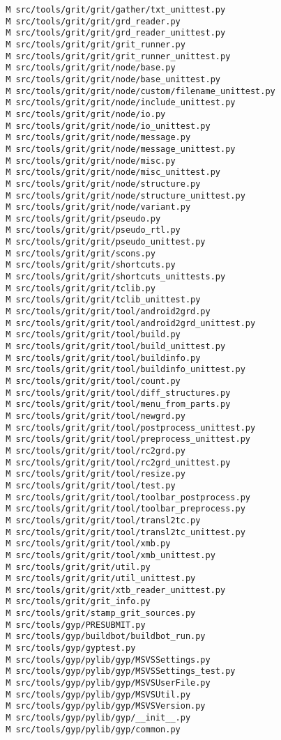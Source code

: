 \documentclass{article}
\begin{document}
\begin{verbatim}
 M src/tools/grit/grit/gather/txt_unittest.py
 M src/tools/grit/grit/grd_reader.py
 M src/tools/grit/grit/grd_reader_unittest.py
 M src/tools/grit/grit/grit_runner.py
 M src/tools/grit/grit/grit_runner_unittest.py
 M src/tools/grit/grit/node/base.py
 M src/tools/grit/grit/node/base_unittest.py
 M src/tools/grit/grit/node/custom/filename_unittest.py
 M src/tools/grit/grit/node/include_unittest.py
 M src/tools/grit/grit/node/io.py
 M src/tools/grit/grit/node/io_unittest.py
 M src/tools/grit/grit/node/message.py
 M src/tools/grit/grit/node/message_unittest.py
 M src/tools/grit/grit/node/misc.py
 M src/tools/grit/grit/node/misc_unittest.py
 M src/tools/grit/grit/node/structure.py
 M src/tools/grit/grit/node/structure_unittest.py
 M src/tools/grit/grit/node/variant.py
 M src/tools/grit/grit/pseudo.py
 M src/tools/grit/grit/pseudo_rtl.py
 M src/tools/grit/grit/pseudo_unittest.py
 M src/tools/grit/grit/scons.py
 M src/tools/grit/grit/shortcuts.py
 M src/tools/grit/grit/shortcuts_unittests.py
 M src/tools/grit/grit/tclib.py
 M src/tools/grit/grit/tclib_unittest.py
 M src/tools/grit/grit/tool/android2grd.py
 M src/tools/grit/grit/tool/android2grd_unittest.py
 M src/tools/grit/grit/tool/build.py
 M src/tools/grit/grit/tool/build_unittest.py
 M src/tools/grit/grit/tool/buildinfo.py
 M src/tools/grit/grit/tool/buildinfo_unittest.py
 M src/tools/grit/grit/tool/count.py
 M src/tools/grit/grit/tool/diff_structures.py
 M src/tools/grit/grit/tool/menu_from_parts.py
 M src/tools/grit/grit/tool/newgrd.py
 M src/tools/grit/grit/tool/postprocess_unittest.py
 M src/tools/grit/grit/tool/preprocess_unittest.py
 M src/tools/grit/grit/tool/rc2grd.py
 M src/tools/grit/grit/tool/rc2grd_unittest.py
 M src/tools/grit/grit/tool/resize.py
 M src/tools/grit/grit/tool/test.py
 M src/tools/grit/grit/tool/toolbar_postprocess.py
 M src/tools/grit/grit/tool/toolbar_preprocess.py
 M src/tools/grit/grit/tool/transl2tc.py
 M src/tools/grit/grit/tool/transl2tc_unittest.py
 M src/tools/grit/grit/tool/xmb.py
 M src/tools/grit/grit/tool/xmb_unittest.py
 M src/tools/grit/grit/util.py
 M src/tools/grit/grit/util_unittest.py
 M src/tools/grit/grit/xtb_reader_unittest.py
 M src/tools/grit/grit_info.py
 M src/tools/grit/stamp_grit_sources.py
 M src/tools/gyp/PRESUBMIT.py
 M src/tools/gyp/buildbot/buildbot_run.py
 M src/tools/gyp/gyptest.py
 M src/tools/gyp/pylib/gyp/MSVSSettings.py
 M src/tools/gyp/pylib/gyp/MSVSSettings_test.py
 M src/tools/gyp/pylib/gyp/MSVSUserFile.py
 M src/tools/gyp/pylib/gyp/MSVSUtil.py
 M src/tools/gyp/pylib/gyp/MSVSVersion.py
 M src/tools/gyp/pylib/gyp/__init__.py
 M src/tools/gyp/pylib/gyp/common.py

\end{verbatim}
\end{document}

